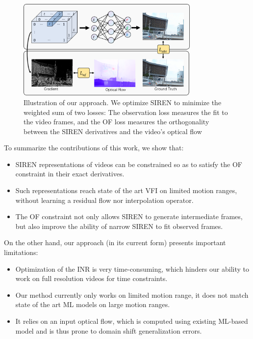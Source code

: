 \documentclass{article}
\begin{document}
\begin{figure}[h]
\centering
\includegraphics[width=0.8\textwidth]{Method}
\caption{Illustration of our approach.
We optimize SIREN to minimize the weighted sum of two losses:
The observation loss measures the fit to the video frames,
and the OF loss measures the orthogonality
between the SIREN derivatives and the video's optical flow}
\end{figure}

To summarize the contributions of this work, we show that:
\begin{itemize}
\item SIREN representations of videos can be constrained so as to satisfy the OF constraint in their exact derivatives.
\item Such representations reach state of the art VFI on limited motion ranges, without learning a residual flow nor interpolation operator.
\item The OF constraint not only allows SIREN to generate intermediate frames, but also improve the ability of narrow SIREN to fit observed frames.
\end{itemize}

On the other hand, our approach (in its current form) presents important limitations:

\begin{itemize}
\item Optimization of the INR is very time-consuming, which hinders our ability to work on full resolution videos for time constraints.
\item Our method currently only works on limited motion range, it does not match state of the art ML models on large motion ranges.
\item It relies on an input optical flow, which is computed using existing ML-based model and is thus prone to domain shift generalization errors.
\end{itemize}
\end{document}

